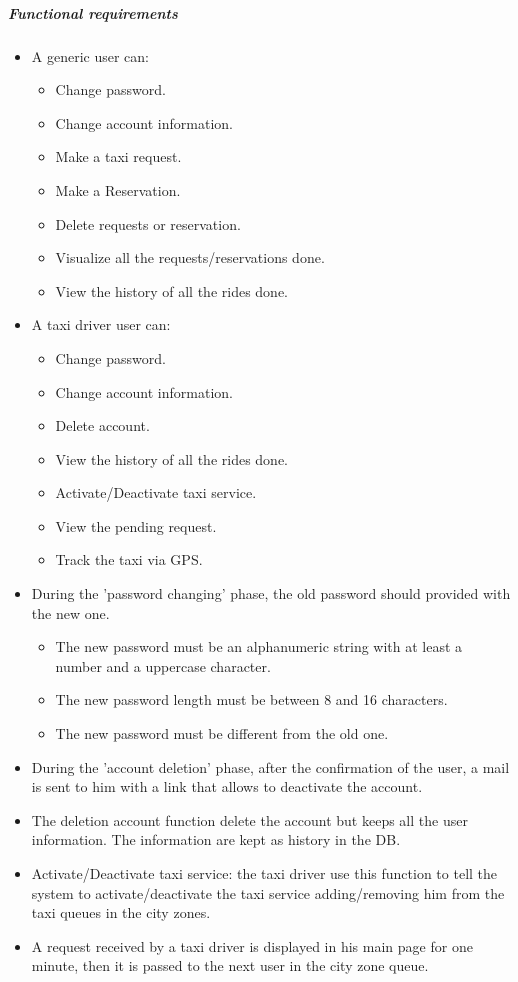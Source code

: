 	\subparagraph{Functional requirements}
	\noindent
		\begin{itemize}
			\item A generic user can:
			\begin{itemize}
				\item Change password.
				\item Change account information.
				\item Make a taxi request.
				\item Make a Reservation.
				\item Delete requests or reservation.
				\item Visualize all the requests/reservations done.
				\item View the history of all the rides done.
			\end{itemize}
			\item A taxi driver user can:
			\begin{itemize}
				\item Change password.
				\item Change account information.
				\item Delete account.
				\item View the history of all the rides done.
				\item Activate/Deactivate taxi service.
				\item View the pending request.
				\item Track the taxi via GPS.
			\end{itemize}
			
			\item During the 'password changing' phase, the old password should provided with the new one.
			\begin{itemize}
				\item The new password must be an alphanumeric string with at least a number and a uppercase character.
				\item The new password length must be between 8 and 16 characters. 
				\item The new password must be different from the old one.
			\end{itemize}
			\item During the 'account deletion' phase, after the confirmation of the user, a mail is sent to him with a link that allows to deactivate the account.
			\item The deletion account function delete the account but keeps all the user information. The information are kept as history in the DB.
			\item Activate/Deactivate taxi service: the taxi driver use this function to tell the system to activate/deactivate the taxi service adding/removing him from the taxi queues in the city zones.
			\item A request received by a taxi driver is displayed in his main page for one minute, then it is passed to the next user in the city zone queue.
		\end{itemize}



